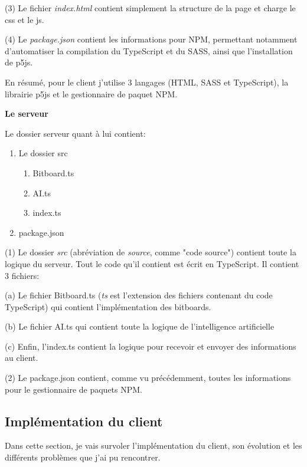 \documentclass[a4paper]{article}
\newcommand{\ptitle}[1]{\vspace{10pt}
{\large \noindent \textbf{#1}}}
\begin{document}
	(3) Le fichier \textit{index.html} contient simplement la structure de la page et charge le css et le js.

	(4) Le \textit{package.json} contient les informations pour NPM, permettant notamment d'automatiser la compilation du TypeScript et du SASS, ainsi que l'installation de p5js.

	En résumé, pour le client j'utilise 3 langages (HTML, SASS et TypeScript), la librairie p5js et le gestionnaire de paquet NPM.

    \ptitle{Le serveur}

	\noindent Le dossier serveur quant à lui contient:
	\begin{enumerate}
		\item Le dossier src
		\begin{enumerate}
            \item Bitboard.ts
            \item AI.ts
            \item index.ts
        \end{enumerate}
		\item package.json
	\end{enumerate}
    \vspace{5pt}

	(1) Le dossier \textit{src} (abréviation de \textit{source}, comme "code source") contient toute la logique du serveur. Tout le code qu'il contient est écrit en TypeScript. Il contient 3 fichiers:
	    
	\indent\indent(a) Le fichier Bitboard.ts (\textit{ts} est l'extension des fichiers contenant du code TypeScript) qui contient l'implémentation des bitboards.

	\indent\indent(b) Le fichier AI.ts qui contient toute la logique de l'intelligence artificielle

	\indent\indent(c) Enfin, l'index.ts contient la logique pour recevoir et envoyer des informations au client.

	(2) Le package.json contient, comme vu précédemment, toutes les informations pour le gestionnaire de paquets NPM.

\subsection{Implémentation du client}    

    Dans cette section, je vais survoler l'implémentation du client, son évolution et les différents problèmes que j'ai pu rencontrer.
\end{document}
